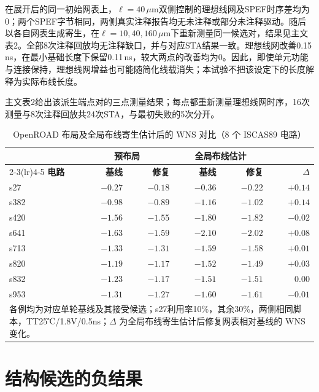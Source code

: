 \documentclass[twocolumn,10pt,fontset=windows]{ctexart}
\begin{document}
在展开后的同一初始网表上，$\ell=40\,\mu$m双侧控制的理想线网及SPEF时序差均为0；两个SPEF字节相同，两侧真实注释报告均无未注释或部分未注释驱动。随后以各自网表生成寄生，在$\ell=10,40,160\,\mu$m下重新测量同一候选对，结果见主文表2。全部8次注释回放均无注释缺口，并与对应STA结果一致。理想线网改善0.15\,ns，在最小基础长度下保留0.11\,ns，较大两点的改善均为0。因此，即使单元功能与连接保持，理想线网增益也可能随简化线载消失；本试验不把该设定下的长度解释为实际布线长度。

主文表2给出该派生端点对的三点测量结果；每点都重新测量理想线网时序，16次测量与8次注释回放共24次STA，与最初失败的5次分开。



\begin{table}[ht]
\centering
\caption{OpenROAD 布局及全局布线寄生估计后的 WNS 对比（8 个 ISCAS89 电路）}
\label{tab:pr8}
\footnotesize
\setlength{\tabcolsep}{2pt}
\begin{tabular}{lrrrrr}
\toprule
 & \multicolumn{2}{c}{\textbf{预布局}} & \multicolumn{2}{c}{\textbf{全局布线估计}} & \\
\cmidrule(lr){2-3}\cmidrule(lr){4-5}
\textbf{电路} & \textbf{基线} & \textbf{修复} & \textbf{基线} & \textbf{修复} & $\Delta$ \\
\midrule
s27  & $-0.27$ & $-0.18$ & $-0.36$ & $-0.22$ & $+0.14$ \\
s382 & $-0.98$ & $-0.89$ & $-1.16$ & $-1.02$ & $+0.14$ \\
s420 & $-1.56$ & $-1.55$ & $-1.80$ & $-1.82$ & $-0.02$ \\
s641 & $-1.63$ & $-1.59$ & $-2.10$ & $-2.02$ & $+0.08$ \\
s713 & $-1.33$ & $-1.31$ & $-1.59$ & $-1.58$ & $+0.01$ \\
s820 & $-1.19$ & $-1.17$ & $-1.52$ & $-1.49$ & $+0.03$ \\
s832 & $-1.23$ & $-1.17$ & $-1.51$ & $-1.51$ & $0.00$ \\
s953 & $-1.31$ & $-1.27$ & $-1.60$ & $-1.61$ & $-0.01$ \\
\bottomrule
\multicolumn{6}{p{0.92\columnwidth}}{\footnotesize 各例均为对应单轮基线及其接受候选；s27利用率10\%，其余30\%，两侧相同脚本，TT25℃/1.8V/0.5ns；$\Delta$ 为全局布线寄生估计后修复网表相对基线的 WNS 变化。}\\
\end{tabular}
\end{table}

\section{结构候选的负结果}
\end{document}
